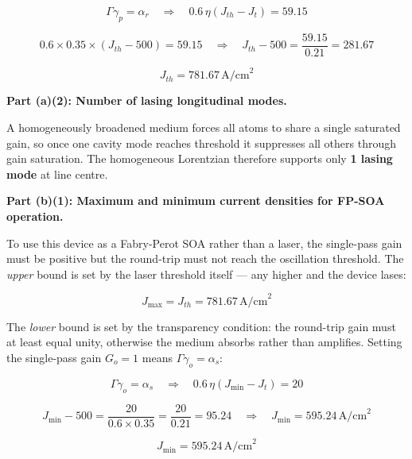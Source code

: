 \begin{equation*}
  \Gamma\gamma_p = \alpha_r \quad\Longrightarrow\quad 0.6\,\eta(J_{th} - J_t) = 59.15
\end{equation*}

\begin{equation*}
  0.6 \times 0.35 \times (J_{th} - 500) = 59.15 \quad\Longrightarrow\quad J_{th} - 500 = \frac{59.15}{0.21} = 281.67
\end{equation*}

\begin{equation*}
  \boxed{J_{th} = 781.67\,\text{A/cm}^2}
\end{equation*}

\textbf{Part (a)(2): Number of lasing longitudinal modes.}

A homogeneously broadened medium forces all atoms to share a single saturated gain, so once one cavity mode reaches threshold it suppresses all others through gain saturation. The homogeneous Lorentzian therefore supports only \textbf{1 lasing mode} at line centre.

\textbf{Part (b)(1): Maximum and minimum current densities for FP-SOA operation.}

To use this device as a Fabry-Perot SOA rather than a laser, the single-pass gain must be positive but the round-trip must not reach the oscillation threshold. The \emph{upper} bound is set by the laser threshold itself — any higher and the device lases:

\begin{equation*}
  \boxed{J_{\max} = J_{th} = 781.67\,\text{A/cm}^2}
\end{equation*}

The \emph{lower} bound is set by the transparency condition: the round-trip gain must at least equal unity, otherwise the medium absorbs rather than amplifies. Setting the single-pass gain $G_o = 1$ means $\Gamma\gamma_o = \alpha_s$:

\begin{equation*}
  \Gamma\gamma_o = \alpha_s \quad\Longrightarrow\quad 0.6\,\eta(J_{\min} - J_t) = 20
\end{equation*}

\begin{equation*}
  J_{\min} - 500 = \frac{20}{0.6 \times 0.35} = \frac{20}{0.21} = 95.24 \quad\Longrightarrow\quad J_{\min} = 595.24\,\text{A/cm}^2
\end{equation*}

\begin{equation*}
  \boxed{J_{\min} = 595.24\,\text{A/cm}^2}
\end{equation*}

